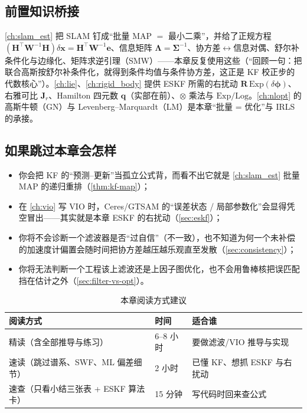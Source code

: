 \subsection*{前置知识桥接}
\cref{ch:slam_est} 把 SLAM 钉成“批量 MAP $=$ 最小二乘”，并给了正规方程 $(\mathbf{H}^\top\mathbf{W}^{-1}\mathbf{H})\delta\mathbf{x}=\mathbf{H}^\top\mathbf{W}^{-1}\mathbf{e}$、信息矩阵 $\boldsymbol{\Lambda}=\boldsymbol{\Sigma}^{-1}$、协方差$\leftrightarrow$信息对偶、舒尔补条件化与边缘化、矩阵求逆引理（SMW）——本章反复使用这些（“回顾一句：把联合高斯按舒尔补条件化，就得到条件均值与条件协方差，这正是 KF 校正步的代数核心”）。\cref{ch:lie}、\cref{ch:rigid_body} 提供 ESKF 所需的右扰动 $\mathbf{R}\,\mathrm{Exp}(\delta\boldsymbol{\phi})$、右雅可比 $\mathbf{J}_r$、Hamilton 四元数 $\mathbf{q}$（实部在前）、$\otimes$ 乘法与 $\mathrm{Exp}/\mathrm{Log}$。\cref{ch:nlopt} 的高斯牛顿（GN）与 Levenberg–Marquardt（LM）是本章“批量 = 优化”与 IRLS 的承接。

\subsection*{如果跳过本章会怎样}
\begin{itemize}
  \item 你会把 KF 的“预测–更新”当孤立公式背，而看不出它就是 \cref{ch:slam_est} 批量 MAP 的递归重排（\cref{thm:kf-map}）；
  \item 在 \cref{ch:vio} 写 VIO 时，Ceres/GTSAM 的“误差状态 / 局部参数化”会显得凭空冒出——其实就是本章 ESKF 的右扰动（\cref{sec:eskf}）；
  \item 你将不会诊断一个滤波器是否“过自信”（不一致），也不知道为何一个未补偿的加速度计偏置会随时间把协方差越压越乐观直至发散（\cref{sec:consistency}）；
  \item 你将无法判断一个工程该上滤波还是上因子图优化，也不会用鲁棒核把误匹配挡在估计之外（\cref{sec:filter-vs-opt}）。
\end{itemize}

\begin{table}[H]\centering\small
\caption{本章阅读方式建议}
\begin{tabular}{lll}
\toprule
阅读方式 & 时间 & 适合谁 \\
\midrule
精读（含全部推导与练习） & 6--8 小时 & 要做滤波/VIO 推导与实现 \\
速读（跳过谱系、SWF、ML 偏差细节） & 2 小时 & 已懂 KF、想抓 ESKF 与右扰动 \\
速查（只看小结三张表 + ESKF 算法卡） & 15 分钟 & 写代码时回来查公式 \\
\bottomrule
\end{tabular}
\end{table}


